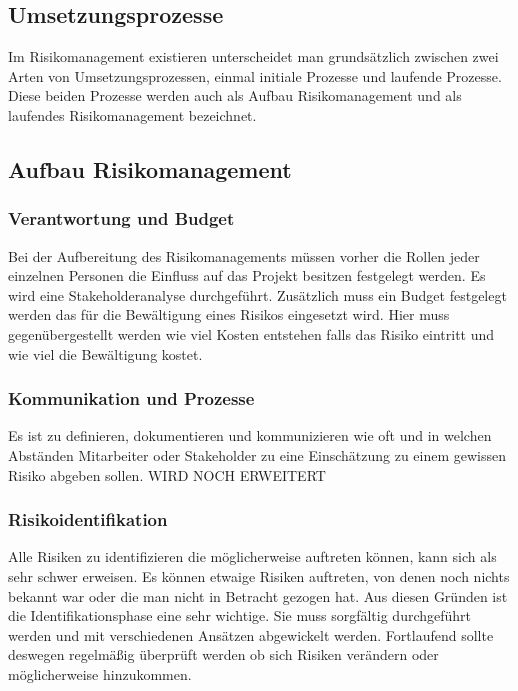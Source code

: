 \subsection{Umsetzungsprozesse}
Im Risikomanagement existieren unterscheidet man grundsätzlich zwischen zwei Arten von Umsetzungsprozessen, einmal initiale Prozesse und laufende Prozesse.
Diese beiden Prozesse werden auch als Aufbau Risikomanagement und als laufendes Risikomanagement bezeichnet.

\subsection{Aufbau Risikomanagement}
\subsubsection{Verantwortung und Budget}
Bei der Aufbereitung des Risikomanagements müssen vorher die Rollen jeder einzelnen Personen die Einfluss auf das Projekt besitzen festgelegt werden. Es wird eine Stakeholderanalyse durchgeführt.
Zusätzlich muss ein Budget festgelegt werden das für die Bewältigung eines Risikos eingesetzt wird. Hier muss gegenübergestellt werden wie viel Kosten entstehen falls das Risiko eintritt und wie viel die Bewältigung kostet.

\subsubsection{Kommunikation und Prozesse}
Es ist zu definieren, dokumentieren und kommunizieren wie oft und in welchen Abständen Mitarbeiter oder Stakeholder zu eine Einschätzung zu einem gewissen Risiko abgeben sollen. 
WIRD NOCH ERWEITERT

\subsubsection{Risikoidentifikation}
Alle Risiken zu identifizieren die möglicherweise auftreten können, kann sich als sehr schwer erweisen. Es können etwaige Risiken auftreten, von denen noch nichts bekannt war oder die man nicht in Betracht gezogen hat. Aus diesen Gründen ist die Identifikationsphase eine sehr wichtige. Sie muss sorgfältig durchgeführt werden und mit verschiedenen Ansätzen abgewickelt werden. Fortlaufend sollte deswegen regelmäßig überprüft werden ob sich Risiken verändern oder möglicherweise hinzukommen.
\\

